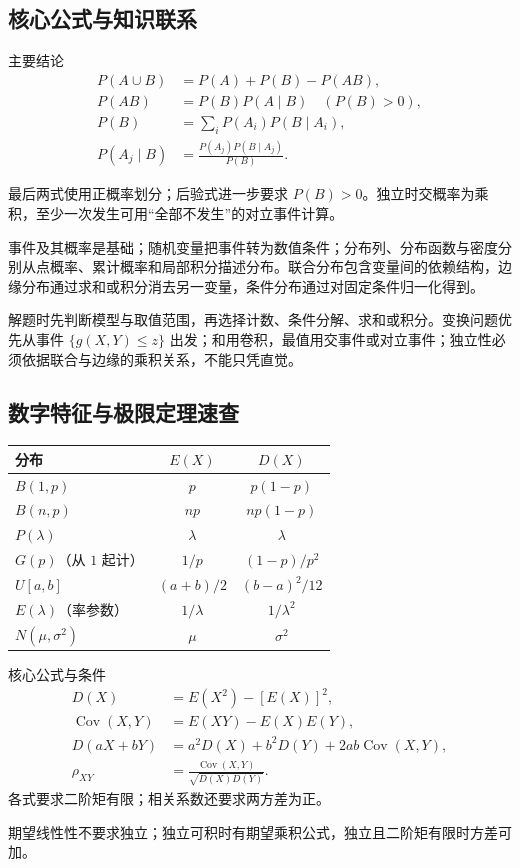 \documentclass[UTF8,fontset=none,zihao=-4,a4paper]{ctexart}
\begin{document}
\subsection{核心公式与知识联系}
\begin{infobox}{主要结论}
\[
\begin{aligned}
P(A\cup B)&=P(A)+P(B)-P(AB),\\
P(AB)&=P(B)P(A\mid B)\quad(P(B)>0),\\
P(B)&=\sum_iP(A_i)P(B\mid A_i),\\
P(A_j\mid B)&=\frac{P(A_j)P(B\mid A_j)}{P(B)}.
\end{aligned}
\]

最后两式使用正概率划分；后验式进一步要求 $P(B)>0$。独立时交概率为乘积，至少一次发生可用“全部不发生”的对立事件计算。
\end{infobox}
事件及其概率是基础；随机变量把事件转为数值条件；分布列、分布函数与密度分别从点概率、累计概率和局部积分描述分布。联合分布包含变量间的依赖结构，边缘分布通过求和或积分消去另一变量，条件分布通过对固定条件归一化得到。

解题时先判断模型与取值范围，再选择计数、条件分解、求和或积分。变换问题优先从事件 $\{g(X,Y)\le z\}$ 出发；和用卷积，最值用交事件或对立事件；独立性必须依据联合与边缘的乘积关系，不能只凭直觉。
\subsection{数字特征与极限定理速查}
\begin{center}\begin{tabularx}{\linewidth}{Y c c}
\toprule 分布&$E(X)$&$D(X)$\\\midrule
$B(1,p)$&$p$&$p(1-p)$\\
$B(n,p)$&$np$&$np(1-p)$\\
$P(\lambda)$&$\lambda$&$\lambda$\\
$G(p)$（从 $1$ 起计）&$1/p$&$(1-p)/p^2$\\
$U[a,b]$&$(a+b)/2$&$(b-a)^2/12$\\
$E(\lambda)$（率参数）&$1/\lambda$&$1/\lambda^2$\\
$N(\mu,\sigma^2)$&$\mu$&$\sigma^2$\\\bottomrule
\end{tabularx}\end{center}
\begin{infobox}{核心公式与条件}
\begin{align*}
D(X)&=E(X^2)-[E(X)]^2,\\
\operatorname{Cov}(X,Y)&=E(XY)-E(X)E(Y),\\
D(aX+bY)&=a^2D(X)+b^2D(Y)+2ab\operatorname{Cov}(X,Y),\\
\rho_{XY}&=\frac{\operatorname{Cov}(X,Y)}{\sqrt{D(X)D(Y)}}.
\end{align*}
各式要求二阶矩有限；相关系数还要求两方差为正。
\end{infobox}
期望线性性不要求独立；独立可积时有期望乘积公式，独立且二阶矩有限时方差可加。
\end{document}
